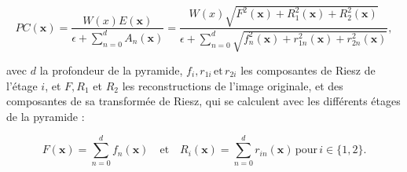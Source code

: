 \begin{equation}
    PC(\mathbf{x}) = \frac{W(x)E(\mathbf{x})}{\epsilon + \sum_{n=0}^{d} A_{n}(\mathbf{x})} = \frac{W(x)\sqrt{F^2(\mathbf{x})+R_1^2(\mathbf{x})+R_2^2(\mathbf{x})}}{\epsilon + \sum_{n=0}^{d} \sqrt{f_n^2(\mathbf{x}) + r_{1n}^2(\mathbf{x}) + r_{2n}^2(\mathbf{x})}},
\end{equation}

avec $d$ la profondeur de la pyramide, $f_i, r_{1i}\, \text{et}\, r_{2i}$ les composantes de Riesz de l'étage $i$, et $F, R_1$ et $R_2$ les reconstructions de l'image originale, et des composantes de sa transformée de Riesz, qui se calculent avec les différents étages de la pyramide :

\begin{equation}
    F(\mathbf{x}) = \sum_{n=0}^{d} f_n(\mathbf{x}) \quad \text{et} \quad R_i(\mathbf{x}) = \sum_{n=0}^{d} r_{in}(\mathbf{x})\, \text{pour}\, i \in \{1, 2\}.
\end{equation}


